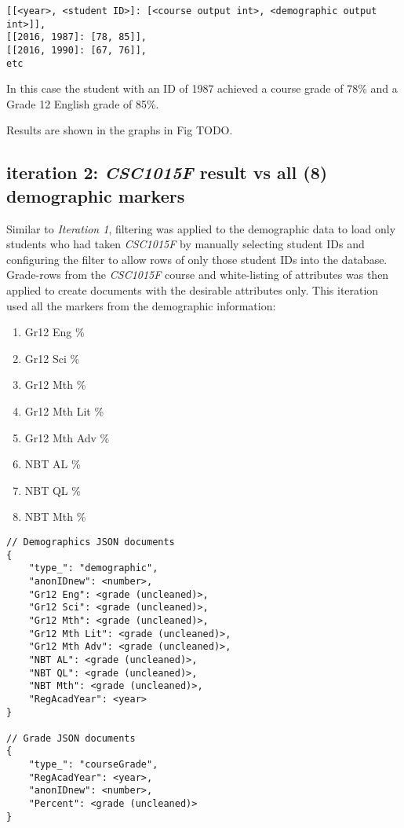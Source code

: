 \begin{verbatim}
[[<year>, <student ID>]: [<course output int>, <demographic output int>]],
[[2016, 1987]: [78, 85]],
[[2016, 1990]: [67, 76]],
etc
\end{verbatim}

In this case the student with an ID of 1987 achieved a course grade of 78\% and a Grade 12 English grade of 85\%.


Results are shown in the graphs in Fig TODO.

\subsection{iteration 2: \textit{CSC1015F} result vs all (8) demographic markers}
Similar to \textit{Iteration 1}, filtering was applied to the demographic data to load only students who had taken \textit{CSC1015F} by manually selecting student IDs and configuring the filter to allow rows of only those student IDs into the database. Grade-rows from the \textit{CSC1015F} course and white-listing of attributes was then applied to create documents with the desirable attributes only. This iteration used all the markers from the demographic information:

\begin{enumerate}
    \item Gr12 Eng \%
    \item Gr12 Sci \%
    \item Gr12 Mth \%
    \item Gr12 Mth Lit \%
    \item Gr12 Mth Adv \%
    \item NBT AL \%
    \item NBT QL \%
    \item NBT Mth \%
\end{enumerate}

\begin{verbatim}
// Demographics JSON documents
{
    "type_": "demographic",
    "anonIDnew": <number>,
    "Gr12 Eng": <grade (uncleaned)>,
    "Gr12 Sci": <grade (uncleaned)>,
    "Gr12 Mth": <grade (uncleaned)>,
    "Gr12 Mth Lit": <grade (uncleaned)>,
    "Gr12 Mth Adv": <grade (uncleaned)>,
    "NBT AL": <grade (uncleaned)>,
    "NBT QL": <grade (uncleaned)>,
    "NBT Mth": <grade (uncleaned)>,
    "RegAcadYear": <year>
}

// Grade JSON documents
{
    "type_": "courseGrade",
    "RegAcadYear": <year>,
    "anonIDnew": <number>,
    "Percent": <grade (uncleaned)>
}
\end{verbatim}

